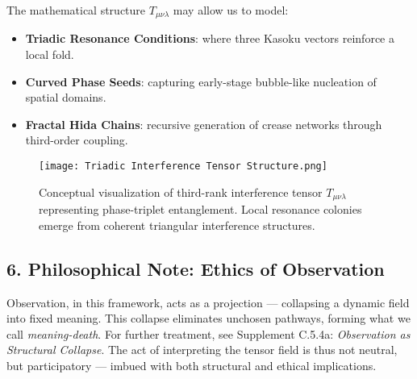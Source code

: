 The mathematical structure \( T_{\mu\nu\lambda} \) may allow us to model:
\begin{itemize}
    \item \textbf{Triadic Resonance Conditions}: where three Kasoku vectors reinforce a local fold.
    \item \textbf{Curved Phase Seeds}: capturing early-stage bubble-like nucleation of spatial domains.
    \item \textbf{Fractal Hida Chains}: recursive generation of crease networks through third-order coupling.
\end{itemize}

\begin{figure}[h!]
\centering
\texttt{[image: Triadic Interference Tensor Structure.png]}
\caption{Conceptual visualization of third-rank interference tensor \( T_{\mu\nu\lambda} \) representing phase-triplet entanglement. Local resonance colonies emerge from coherent triangular interference structures.}
\end{figure}

\subsection*{6. Philosophical Note: Ethics of Observation}
Observation, in this framework, acts as a projection — collapsing a dynamic field into fixed meaning. This collapse eliminates unchosen pathways, forming what we call \textit{meaning-death}. For further treatment, see Supplement C.5.4a: \emph{Observation as Structural Collapse}. The act of interpreting the tensor field is thus not neutral, but participatory — imbued with both structural and ethical implications.
